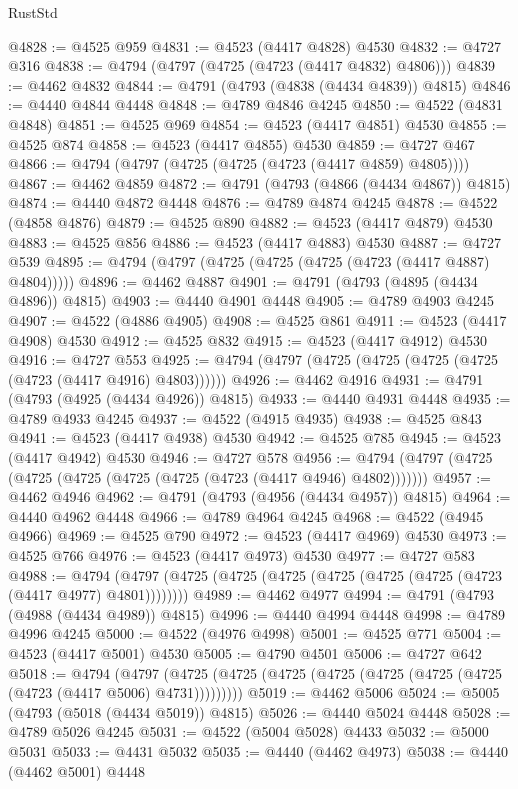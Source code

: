 \begin{lexlean}{RustStd}
\begin{coremodule}
{\begin{coremodule}
{{{{{{{{{{{{{{{{{{{{{{{{{{{{{{{{{{{{{{{{{{{{{{{{{{{{{{{{{{{{@4828 := @4525 @959
@4831 := @4523 (@4417 @4828) @4530
@4832 := @4727 @316
@4838 := @4794 (@4797 (@4725 (@4723 (@4417 @4832) @4806)))
@4839 := @4462 @4832
@4844 := @4791 (@4793 (@4838 (@4434 @4839)) @4815)
@4846 := @4440 @4844 @4448
@4848 := @4789 @4846 @4245
@4850 := @4522 (@4831 @4848)
@4851 := @4525 @969
@4854 := @4523 (@4417 @4851) @4530
@4855 := @4525 @874
@4858 := @4523 (@4417 @4855) @4530
@4859 := @4727 @467
@4866 := @4794 (@4797 (@4725 (@4725 (@4723 (@4417 @4859) @4805))))
@4867 := @4462 @4859
@4872 := @4791 (@4793 (@4866 (@4434 @4867)) @4815)
@4874 := @4440 @4872 @4448
@4876 := @4789 @4874 @4245
@4878 := @4522 (@4858 @4876)
@4879 := @4525 @890
@4882 := @4523 (@4417 @4879) @4530
@4883 := @4525 @856
@4886 := @4523 (@4417 @4883) @4530
@4887 := @4727 @539
@4895 := @4794 (@4797 (@4725 (@4725 (@4725 (@4723 (@4417 @4887) @4804)))))
@4896 := @4462 @4887
@4901 := @4791 (@4793 (@4895 (@4434 @4896)) @4815)
@4903 := @4440 @4901 @4448
@4905 := @4789 @4903 @4245
@4907 := @4522 (@4886 @4905)
@4908 := @4525 @861
@4911 := @4523 (@4417 @4908) @4530
@4912 := @4525 @832
@4915 := @4523 (@4417 @4912) @4530
@4916 := @4727 @553
@4925 := @4794 (@4797 (@4725 (@4725 (@4725 (@4725 (@4723 (@4417 @4916) @4803))))))
@4926 := @4462 @4916
@4931 := @4791 (@4793 (@4925 (@4434 @4926)) @4815)
@4933 := @4440 @4931 @4448
@4935 := @4789 @4933 @4245
@4937 := @4522 (@4915 @4935)
@4938 := @4525 @843
@4941 := @4523 (@4417 @4938) @4530
@4942 := @4525 @785
@4945 := @4523 (@4417 @4942) @4530
@4946 := @4727 @578
@4956 := @4794 (@4797 (@4725 (@4725 (@4725 (@4725 (@4725 (@4723 (@4417 @4946) @4802)))))))
@4957 := @4462 @4946
@4962 := @4791 (@4793 (@4956 (@4434 @4957)) @4815)
@4964 := @4440 @4962 @4448
@4966 := @4789 @4964 @4245
@4968 := @4522 (@4945 @4966)
@4969 := @4525 @790
@4972 := @4523 (@4417 @4969) @4530
@4973 := @4525 @766
@4976 := @4523 (@4417 @4973) @4530
@4977 := @4727 @583
@4988 := @4794 (@4797 (@4725 (@4725 (@4725 (@4725 (@4725 (@4725 (@4723 (@4417 @4977) @4801))))))))
@4989 := @4462 @4977
@4994 := @4791 (@4793 (@4988 (@4434 @4989)) @4815)
@4996 := @4440 @4994 @4448
@4998 := @4789 @4996 @4245
@5000 := @4522 (@4976 @4998)
@5001 := @4525 @771
@5004 := @4523 (@4417 @5001) @4530
@5005 := @4790 @4501
@5006 := @4727 @642
@5018 := @4794
    (@4797 (@4725 (@4725 (@4725 (@4725 (@4725 (@4725 (@4725 (@4723 (@4417 @5006) @4731)))))))))
@5019 := @4462 @5006
@5024 := @5005 (@4793 (@5018 (@4434 @5019)) @4815)
@5026 := @4440 @5024 @4448
@5028 := @4789 @5026 @4245
@5031 := @4522 (@5004 @5028) @4433
@5032 := @5000 @5031
@5033 := @4431 @5032
@5035 := @4440 (@4462 @4973)
@5038 := @4440 (@4462 @5001) @4448
}}}}}}}}}}}}}}}}}}}}}}}}}}}}}}}}}}}}}}}}}}}}}}}}}}}}}}}}}}}}
\end{coremodule}}
\end{coremodule}
\end{lexlean}
